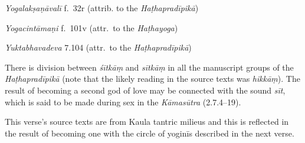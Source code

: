 \begin{ekdosis}
\begin{testimonia}[hp02_054]
\emph{Yogalakṣaṇāvalī} f.~32r (attrib. to the \emph{Haṭhapradīpikā})
\begin{versinnote}
\end{versinnote}

\emph{Yogacintāmaṇi} f.~101v (attr.~to the \emph{Haṭhayoga})

\begin{versinnote}
\end{versinnote}

\emph{Yuktabhavadeva} 7.104 (attr.~to the \emph{Haṭhapradīpikā})

\begin{versinnote} 
\end{versinnote}


\end{testimonia}

\begin{philcomm}[hp02_054]


There is division between \emph{śītkāṃ} and \emph{sītkāṃ} in all the manuscript groups of the \emph{Haṭhapradīpikā} (note that the likely reading in the source texts was \emph{hikkāṃ}). The result of becoming a second god of love may be connected with the sound \emph{sīt}, which is said to be made during sex in the \emph{Kāmasūtra} (2.7.4–19). 

This verse’s source texts are from Kaula tantric milieus and this is reflected in the result of becoming one with the circle of yoginīs described in the next verse.


\end{philcomm}
\end{ekdosis}

